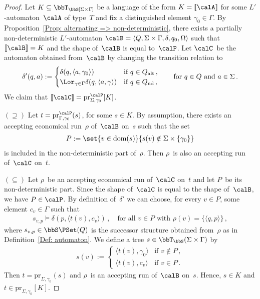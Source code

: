 \documentclass[10pt, fleqn]{scrartcl}
\DeclareRobustCommand*{\dom}{\qopname\relax o{dom}}
\newcommand*{\pr}{\mathrm{pr}}
\newcommand*{\?}{\kern .08em}
\newcommand\lsem{[\![}
\newcommand\rsem{]\!]}
\begin{document}
\begin{proof}
Let $K \subseteq \bbT_\bbS[\Sigma \times \Gamma]$ be a language of the form
$K = \lsem\calA\rsem$ for some $L'$-automaton~$\calA$ of type~$T$
and fix a distinguished element $\gamma_0 \in \Gamma$.
By Proposition~\ref{Prop: alternating => non-deterministic}, there exists a
partially non-deterministic $L'$-automaton
$\calB = \langle Q,\Sigma \times \Gamma,\delta,q_0,\Omega\rangle$
such that $\lsem\calB\rsem = K$ and the shape of~$\calB$ is equal to~$\calP$.
Let $\calC$~be the automaton obtained from~$\calB$ by changing the transition relation to
\begin{align*}
  \delta'(q,a) :=
    \begin{cases}
      \delta(q,\langle a,\gamma_0\rangle)
        &\text{if } q \in Q_{\mathrm{alt}}\,, \\
      \displaystyle
      \Lor_{\gamma \in \Gamma} \delta(q,\langle a,\gamma\rangle)
        &\text{if } q \in Q_{\mathrm{nd}}\,,
    \end{cases}
  \qquad\text{for } q \in Q \text{ and } a \in \Sigma\,.
\end{align*}
We claim that $\lsem\calC\rsem = \pr^\calP_{\Sigma,\gamma_0}[K]$.

$(\supseteq)$ Let $t = \pr^\calP_{\Gamma,\gamma_0}(s)$, for some $s \in K$.
By assumption, there exists an accepting economical run~$\rho$ of~$\calB$ on~$s$
such that the set
\begin{align*}
  P := \set{ v \in \dom(s) }{ s(v) \notin \Sigma \times \{\gamma_0\} }
\end{align*}
is included in the non-deterministic part of~$\rho$.
Then $\rho$~is also an accepting run of~$\calC$ on~$t$.

$(\subseteq)$
Let $\rho$~be an accepting economical run of~$\calC$ on~$t$ and
let $P$~be its non-deterministic part.
Since the shape of~$\calC$ is equal to the shape of~$\calB$, we have $P \in \calP$.
By definition of~$\delta'$ we can choose, for every $v \in P$, some element $c_v \in \Gamma$
such that
\begin{align*}
  s_{v,p} \models \delta(p,\langle t(v),c_v\rangle)\,, \quad\text{for all } v \in P
  \text{ with } \rho(v) = \{\langle q,p\rangle\}\,,
\end{align*}
where $s_{v,p} \in \bbS\PSet(Q)$ is the successor structure obtained from~$\rho$
as in Definition~\ref{Def: automaton}.
We define a tree $s \in \bbT_\bbS(\Sigma \times \Gamma)$ by
\begin{align*}
  s(v) := \begin{cases}
            \langle t(v),\gamma_0\rangle &\text{if } v \notin P\,, \\
            \langle t(v),c_v\rangle      &\text{if } v \in P\,.
          \end{cases}
\end{align*}
Then $t = \pr_{\Sigma,\gamma_0}(s)$ and $\rho$~is an accepting run of~$\calB$ on~$s$.
Hence, $s \in K$ and $t \in \pr_{\Sigma,\gamma_0}[K]$.
\end{proof}
\end{document}
